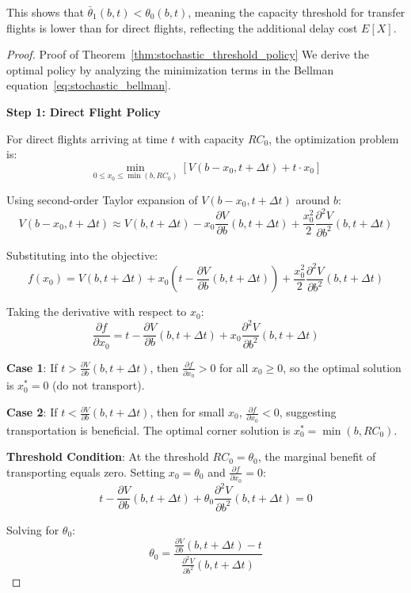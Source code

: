 \documentclass[opre,sglanonrev]{informs4}
\begin{document}
{\begin{theorem}
This shows that \( \bar{\theta}_1(b, t) < \theta_0(b, t) \), meaning the capacity threshold for transfer flights is lower than for direct flights, reflecting the additional delay cost \( E[X] \).
\end{theorem}

\begin{proof}{Proof of Theorem~\ref{thm:stochastic_threshold_policy}}
We derive the optimal policy by analyzing the minimization terms in the Bellman equation~\eqref{eq:stochastic_bellman}.

\textbf{Step 1: Direct Flight Policy}

For direct flights arriving at time \( t \) with capacity \( R C_0 \), the optimization problem is:
\[
\min_{0 \leq x_0 \leq \min(b, R C_0)} \left[ V(b - x_0, t + \Delta t) + t \cdot x_0 \right]
\]

Using second-order Taylor expansion of \( V(b - x_0, t + \Delta t) \) around \( b \):
\[
V(b - x_0, t + \Delta t) \approx V(b, t + \Delta t) - x_0 \frac{\partial V}{\partial b}(b, t + \Delta t) + \frac{x_0^2}{2} \frac{\partial^2 V}{\partial b^2}(b, t + \Delta t)
\]

Substituting into the objective:
\[
f(x_0) = V(b, t + \Delta t) + x_0 \left( t - \frac{\partial V}{\partial b}(b, t + \Delta t) \right) + \frac{x_0^2}{2} \frac{\partial^2 V}{\partial b^2}(b, t + \Delta t)
\]

Taking the derivative with respect to \( x_0 \):
\[
\frac{\partial f}{\partial x_0} = t - \frac{\partial V}{\partial b}(b, t + \Delta t) + x_0 \frac{\partial^2 V}{\partial b^2}(b, t + \Delta t)
\]

\textbf{Case 1}: If \( t > \frac{\partial V}{\partial b}(b, t + \Delta t) \), then \( \frac{\partial f}{\partial x_0} > 0 \) for all \( x_0 \geq 0 \), so the optimal solution is \( x_0^* = 0 \) (do not transport).

\textbf{Case 2}: If \( t < \frac{\partial V}{\partial b}(b, t + \Delta t) \), then for small \( x_0 \), \( \frac{\partial f}{\partial x_0} < 0 \), suggesting transportation is beneficial. The optimal corner solution is \( x_0^* = \min(b, R C_0) \).

\textbf{Threshold Condition}: At the threshold \( R C_0 = \theta_0 \), the marginal benefit of transporting equals zero. Setting \( x_0 = \theta_0 \) and \( \frac{\partial f}{\partial x_0} = 0 \):
\[
t - \frac{\partial V}{\partial b}(b, t + \Delta t) + \theta_0 \frac{\partial^2 V}{\partial b^2}(b, t + \Delta t) = 0
\]

Solving for \( \theta_0 \):
\[
\theta_0 = \frac{\frac{\partial V}{\partial b}(b, t + \Delta t) - t}{\frac{\partial^2 V}{\partial b^2}(b, t + \Delta t)}
\]


\end{proof}}
\end{document}
